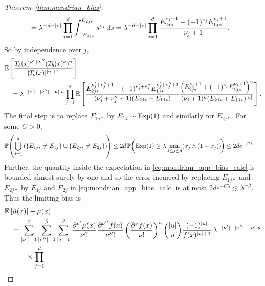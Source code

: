 \begin{proof}[Theorem~\ref{thm:mondrian_bias}]
\begin{align*}
    &=
    \lambda^{-d - |\nu|}
    \prod_{j=1}^d
    \int_{-E_{1j*}}^{E_{2j*}} s^{\nu_j} \,\mathrm{d}s
    = \lambda^{-d - |\nu|}
    \prod_{j=1}^d
    \frac{E_{2j*}^{\nu_j + 1} + (-1)^{\nu_j} E_{1j*}^{\nu_j + 1}}
    {\nu_j + 1}.
  \end{align*}
  So by independence over $j$,
  \begin{align}
    \label{eq:mondrian_app_bias_calc}
    &\mathbb{E} \left[
      \frac{ T_b(x)^{\nu' + \nu''} (T_b(x)^\nu)^u}{|T_b(x)|^{|u|+1}}
    \right] \\
    \nonumber
    &\quad=
    \lambda^{- |\nu'| - |\nu''| - |\nu| \cdot u}
    \prod_{j=1}^d
    \mathbb{E} \left[
      \frac{E_{2j*}^{\nu'_j + \nu''_j + 1}
      + (-1)^{\nu'_j + \nu''_j} E_{1j*}^{\nu'_j + \nu''_j + 1}}
      {(\nu'_j + \nu''_j + 1) (E_{2j*} + E_{1j*})}
      \frac{\left(E_{2j*}^{\nu_j + 1}
      + (-1)^{\nu_j} E_{1j*}^{\nu_j + 1}\right)^u}
      {(\nu_j + 1)^u (E_{2j*} + E_{1j*})^{|u|}}
    \right].
  \end{align}
  The final step is to replace $E_{1j*}$
  by $E_{1j} \sim \operatorname{Exp}(1)$ and similarly for $E_{2j*}$.
  For some $C > 0$,
  \begin{align*}
    \mathbb{P} \! \left(
      \bigcup_{j=1}^{d}
      \left(
        \left\{
          E_{1j*} \neq E_{1j}
        \right\}
        \cup
        \left\{
          E_{2j*} \neq E_{2j}
        \right\}
      \right)
    \! \right)
    &\leq
    2d\,
    \mathbb{P} \! \left(
      \operatorname{Exp}(1) \geq \lambda \min_{1 \leq j \leq d}
      (x_j \wedge (1-x_j))
    \! \right)
    \leq
    2d e^{-C \lambda}.
  \end{align*}
  Further, the quantity inside the expectation in
  \eqref{eq:mondrian_app_bias_calc}
  is bounded almost surely by one and so
  the error incurred by replacing
  $E_{1j*}$ and $E_{2j*}$ by $E_{1j}$ and $E_{2j}$
  in \eqref{eq:mondrian_app_bias_calc}
  is at most $2 d e^{-C \lambda} \lesssim \lambda^{-\beta}$.
  Thus the limiting bias is
  \begin{align}
    \nonumber
    &\E \left[ \hat \mu(x) \right]
    - \mu(x) \\
    \nonumber
    &\quad=
    \sum_{|\nu'|=1}^{\flbeta}
    \sum_{|\nu''|=0}^{\flbeta}
    \sum_{|u|=0}^{\flbeta}
    \frac{\partial^{\nu'} \mu(x)}{\nu' !}
    \frac{\partial^{\nu''} f(x)}{\nu'' !}
    \left( \frac{\partial^\nu f(x)}{\nu !} \right)^u
    \binom{|u|}{u}
    \frac{(-1)^{|u|}}{f(x)^{|u|+1}}
    \, \lambda^{- |\nu'| - |\nu''| - |\nu| \cdot u} \\
    \nonumber
    &\qquad\quad\times
    \prod_{j=1}^d

\end{align}
\end{proof}

